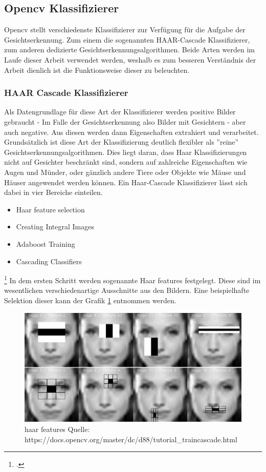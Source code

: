 \documentclass[12pt, a4paper]{scrbook}
\begin{document}
\subsection{Opencv Klassifizierer}
Opencv stellt verschiedenste Klassifizierer zur Verfügung für die Aufgabe der Gesichtserkennung. Zum einem die sogenannten HAAR-Cascade Klassifizierer, zum anderen dedizierte Gesichtserkennungsalgorithmen. Beide Arten werden im Laufe dieser Arbeit verwendet werden, weshalb es zum besseren Verständnis der Arbeit dienlich ist die Funktionsweise dieser zu beleuchten.
\subsubsection{HAAR Cascade Klassifizierer}
Als Datengrundlage für diese Art der Klassifizierer werden positive Bilder gebraucht - Im Falle der Gesichtserkennung also Bilder mit Gesichtern - aber auch negative. Aus diesen werden dann Eigenschaften extrahiert und verarbeitet. Grundsätzlich ist diese Art der Klassifizierung deutlich flexibler als ''reine'' Gesichtserkennungsalgorithmen. Dies liegt daran, dass Haar Klassifizierungen nicht auf Gesichter beschränkt sind, sondern auf zahlreiche Eigenschaften wie Augen und Münder, oder gänzlich andere Tiere oder Objekte wie Mäuse und Häuser angewendet werden können.
Ein Haar-Cascade Klassifizierer lässt sich dabei in vier Bereiche einteilen.
\begin{itemize}
\item Haar feature selection
\item Creating  Integral Images
\item Adaboost Training
\item Cascading Classifiers
\end{itemize}
\footcite[Vgl.][]{willberger}
In dem ersten Schritt werden sogenannte Haar features festgelegt. Diese sind im wesentlichen verschiedenartige Ausschnitte aus den Bildern. Eine beispielhafte Selektion dieser kann der   Grafik \ref{fig: haar-features} entnommen werden.
\begin{figure}[h]
\includegraphics[width=\linewidth]{Bilder/haar-cascade.png}
\caption{haar features \newline Quelle: https://docs.opencv.org/master/dc/d88/tutorial\_traincascade.html}
\label{fig: haar-features}
\end{figure}
\end{document}
